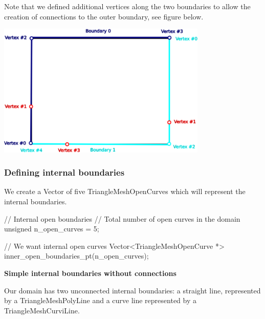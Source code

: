 Note that we defined additional vertices along the two boundaries to allow the creation of connections to the outer boundary, see figure below.

 
\begin{DoxyImage}
\includegraphics[width=0.75\textwidth]{outer_boundary_vertices}
\end{DoxyImage}
\hypertarget{index_def_inopen}{}\subsubsection{Defining internal boundaries}\label{index_def_inopen}
We create a {\ttfamily Vector} of five {\ttfamily Triangle\+Mesh\+Open\+Curves} which will represent the internal boundaries.

 
\begin{DoxyCodeInclude}
  \textcolor{comment}{// Internal open boundaries}
  \textcolor{comment}{// Total number of open curves in the domain}
  \textcolor{keywordtype}{unsigned} n\_open\_curves = 5;

  \textcolor{comment}{// We want internal open curves}
  Vector<TriangleMeshOpenCurve *> inner\_open\_boundaries\_pt(n\_open\_curves);

\end{DoxyCodeInclude}






{\bfseries  Simple internal boundaries without connections }

Our domain has two unconnected internal boundaries\+: a straight line, represented by a {\ttfamily Triangle\+Mesh\+Poly\+Line} and a curve line represented by a {\ttfamily Triangle\+Mesh\+Curvi\+Line}.

